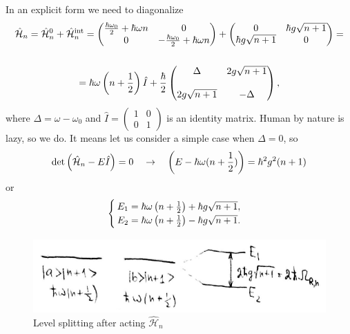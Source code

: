 In an explicit form we need to diagonalize
\begin{multline}
	\hat{\mathcal{H}}_n = \hat{\mathcal{H}}^0_{n} + \hat{\mathcal{H}}^{\text{int}}_n =
	\begin{pmatrix}
		\frac{\hbar \omega_0}{2} + \hbar \omega n & 0 \\
		0 & - \frac{\hbar \omega_0}{2} + \hbar \omega n
	\end{pmatrix} +
	\begin{pmatrix}
		0 & \hbar g \sqrt{n+1} \\
		\hbar g \sqrt{n+1} & 0
	\end{pmatrix} = \\ \\ =
	\hbar \omega \left( n+ \frac{1}{2} \right) \hat{I}
	+ \frac{\hbar}{2} \begin{pmatrix}
		\Delta & 2g \sqrt{n+1} \\ \\
		2g \sqrt{n+1} & - \Delta
	\end{pmatrix},
\end{multline}
where $\Delta = \omega - \omega_0$ and $\hat{I} = \begin{pmatrix}
1 & 0 \\
0 & 1
\end{pmatrix}$ is an identity matrix. Human by nature is lazy, so we do. It means let us consider a simple case when $\Delta = 0$, so
\begin{equation}
	\det \left( \hat{\mathcal{H}}_n - E \hat{I} \right) = 0 \quad \to \quad \left( E - \hbar \omega (n + \frac{1}{2}) \right) = \hbar^2 g^2 (n+1)
\end{equation}
or
\begin{equation}
	\begin{cases}
		E_1 = \hbar \omega \left( n + \frac{1}{2} \right) + \hbar g \sqrt{n+1}, \\
		E_2 = \hbar \omega \left( n + \frac{1}{2} \right) - \hbar g \sqrt{n+1}.
	\end{cases}
\end{equation}
\begin{figure}
	\centering
	\includegraphics[width=0.7\linewidth]{fig/L6/leveeeelllls}
	\caption{Level splitting after acting $\hat{\mathcal{H}}_n$}
	\label{fig:leveeeelllls}
\end{figure}
